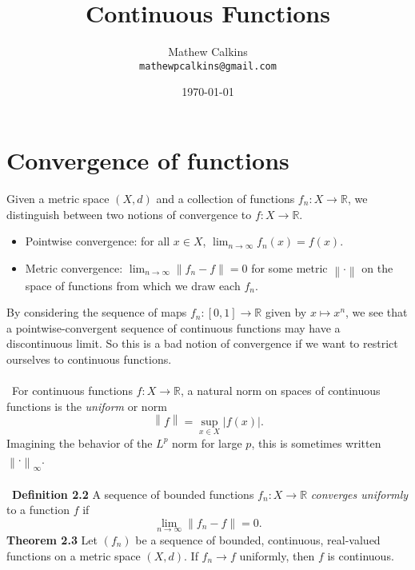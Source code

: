 \documentclass[12 pt]{article}
\newcommand{\R}{\mathbb{R}}
\newcommand{\nm}[1]{\left\| #1 \right\|}
\numberwithin{equation}{section}
\begin{document}
\title{Continuous Functions}
\author{Mathew Calkins\\
  \texttt{mathewpcalkins@gmail.com}}

\date{\today}

\maketitle

\tableofcontents


\section{Convergence of functions}

Given a metric space $(X, d)$ and a collection of functions $f_n: X \to \R$, we distinguish between two notions of convergence to $f: X \to \R$. \begin{itemize}
\item Pointwise convergence: for all $x \in X$, $\lim_{n \to \infty} f_n(x) = f(x)$.
\item Metric convergence: $\lim_{n \to \infty} \nm{f_n - f} = 0$ for some metric $\nm{\cdot}$ on the space of functions from which we draw each $f_n$.
\end{itemize}
By considering the sequence of maps $f_n: [0,1] \to \R$ given by $x \mapsto x^n$, we see that a pointwise-convergent sequence of continuous functions may have a discontinuous limit. So this is a bad notion of convergence if we want to restrict ourselves to continuous functions.\\
\\
\
For continuous functions $f: X \to \R$, a natural norm on spaces of continuous functions is the \textit{uniform} or  norm \begin{equation*}
\nm{f} = \sup _{x \in X} |f(x)|.
\end{equation*}
Imagining the behavior of the $L^p$ norm for large $p$, this is sometimes written $\nm{\cdot}_\infty$.\\
\\
\
\textbf{Definition 2.2} A sequence of bounded functions $f_n: X \to \R$ \textit{converges uniformly} to a function $f$ if \begin{equation*}
\lim_{n \to \infty} \nm{f_n - f} = 0.
\end{equation*}
\textbf{Theorem 2.3} Let $(f_n)$ be a sequence of bounded, continuous, real-valued functions on a metric space $(X,d)$. If $f_n \to f$ uniformly, then $f$ is continuous.\\
\end{document}
